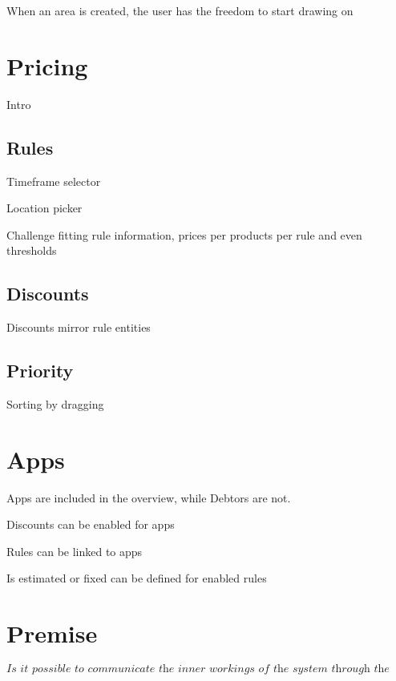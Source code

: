 When an area is created, the user has the freedom to start drawing on

%
\section{Pricing}
Intro

\subsection{Rules}
Timeframe selector

Location picker

Challenge fitting rule information, prices per products per rule and even thresholds

\subsection{Discounts}
Discounts mirror rule entities

\subsection{Priority}
Sorting by dragging

%
\section{Apps}
Apps are included in the overview, while Debtors are not.

Discounts can be enabled for apps

Rules can be linked to apps

Is estimated or fixed can be defined for enabled rules


\section{Premise}
\[\textit{Is it possible to communicate the inner workings of the system through the user interface?}\]\hfill

